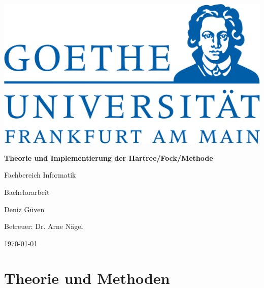 \documentclass[a4paper, 12pt, ngerman]{report}
\author{Deniz Güven}
\begin{document}
\begin{titlepage}
  \begin{center}
    \includegraphics[width=0.5\linewidth]{res/uni.png}
    \vspace{2cm}

    \huge{\textbf{Theorie und Implementierung der Hartree\-/Fock\-/Methode}}
    \vspace{1cm}

    \Large
    Fachbereich Informatik

    Bachelorarbeit

    Deniz Güven
    \vfill

    Betreuer: Dr. Arne Nägel

    \today
  \end{center}
\end{titlepage}

\tableofcontents




\chapter{Theorie und Methoden}















\end{document}
